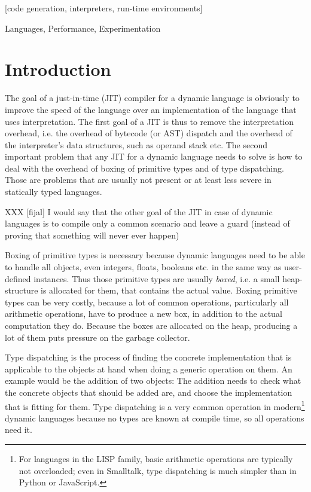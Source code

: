 \documentclass[preprint]{sigplanconf}
\begin{document}
[code generation,
interpreters, run-time environments]

\terms
Languages, Performance, Experimentation


\section{Introduction}

The goal of a just-in-time (JIT) compiler for a dynamic language is obviously to
improve the speed of the language over an implementation of the language that
uses interpretation. The first goal of a JIT is thus to remove the
interpretation overhead, i.e. the overhead of bytecode (or AST) dispatch and the
overhead of the interpreter's data structures, such as operand stack etc. The
second important problem that any JIT for a dynamic language needs to solve is
how to deal with the overhead of boxing of primitive types and of type
dispatching. Those are problems that are usually not present or at least less
severe in statically typed languages.

XXX [fijal] I would say that the other goal of the JIT in case of dynamic
languages is to compile only a common scenario and leave a guard (instead
of proving that something will never ever happen)

Boxing of primitive types is necessary because dynamic languages need to be able to handle
all objects, even integers, floats, booleans etc. in the same way as user-defined
instances. Thus those primitive types are usually \emph{boxed}, i.e. a small
heap-structure is allocated for them, that contains the actual value. Boxing
primitive types can be very costly, because a lot of common operations,
particularly all arithmetic operations, have to produce a new box, in addition
to the actual computation they do. Because the boxes are allocated on the heap,
producing a lot of them puts pressure on the garbage collector.

Type dispatching is the process of finding the concrete implementation that is
applicable to the objects at hand when doing a generic operation on them. An
example would be the addition of two objects: The addition needs to check what
the concrete objects that should be added are, and choose the implementation
that is fitting for them. Type dispatching is a very common operation in
modern\footnote{For languages in the LISP family, basic arithmetic operations
are typically not overloaded; even in Smalltalk, type dispatching is much
simpler than in Python or JavaScript.}
dynamic languages because no types are known at compile time, so all operations
need it.
\end{document}
